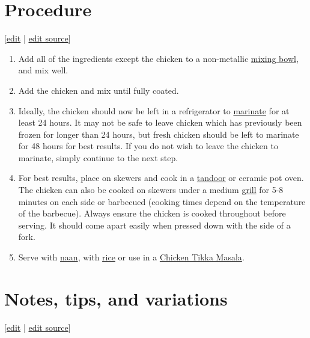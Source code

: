 \documentclass[11pt,a4paper]{article}
\begin{document}
\section{Procedure}

[\href{https://en.wikibooks.org/w/index.php?title=Cookbook:Chicken\_Tikka\&veaction=edit\&section=2}{edit} | \href{https://en.wikibooks.org/w/index.php?title=Cookbook:Chicken\_Tikka\&action=edit\&section=2}{edit source}]

\begin{enumerate}
\item Add all of the ingredients except the chicken to a non-metallic \href{https://en.wikibooks.org/wiki/Cookbook:Mixing\_Bowl}{mixing bowl}, and mix well.
\item Add the chicken and mix until fully coated.
\item Ideally, the chicken should now be left in a refrigerator to \href{https://en.wikibooks.org/wiki/Cookbook:Marinating}{marinate} for at least 24 hours. It may not be safe to leave chicken which has previously been frozen for longer than 24 hours, but fresh chicken should be left to marinate for 48 hours for best results. If you do not wish to leave the chicken to marinate, simply continue to the next step.
\item For best results, place on skewers and cook in a \href{https://en.wikibooks.org/wiki/Cookbook:Tandoor}{tandoor} or ceramic pot oven. The chicken can also be cooked on skewers under a medium \href{https://en.wikibooks.org/wiki/Cookbook:Grilling}{grill} for 5-8 minutes on each side or barbecued (cooking times depend on the temperature of the barbecue). Always ensure the chicken is cooked throughout before serving. It should come apart easily when pressed down with the side of a fork.
\item Serve with \href{https://en.wikibooks.org/wiki/Cookbook:Naan}{naan}, with \href{https://en.wikibooks.org/wiki/Cookbook:Rice}{rice} or use in a \href{https://en.wikibooks.org/wiki/Cookbook:Chicken\_Tikka\_Masala}{Chicken Tikka Masala}.
\end{enumerate}

\section{Notes, tips, and variations}

[\href{https://en.wikibooks.org/w/index.php?title=Cookbook:Chicken\_Tikka\&veaction=edit\&section=3}{edit} | \href{https://en.wikibooks.org/w/index.php?title=Cookbook:Chicken\_Tikka\&action=edit\&section=3}{edit source}]
\end{document}
